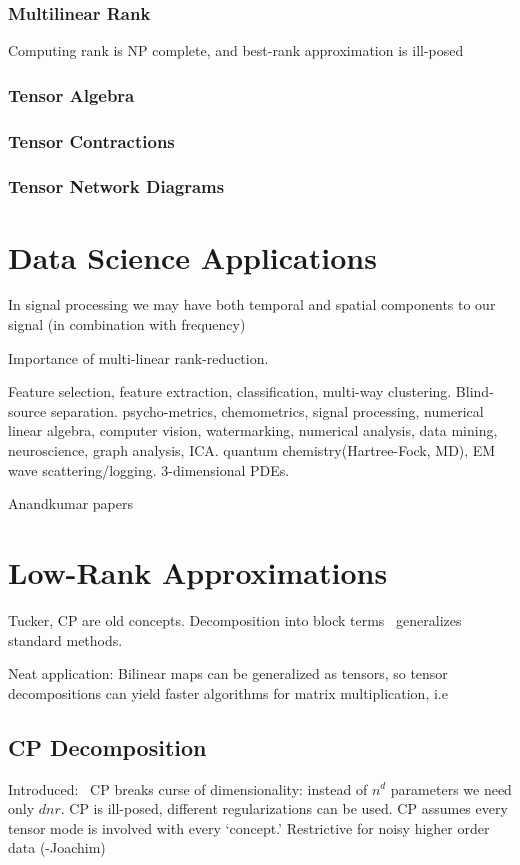 \documentclass[leqno,onefignum,onetabnum]{siamltex1213}
\begin{document}
\subsubsection{Multilinear Rank}
Computing rank is NP complete, and best-rank approximation is ill-posed~\cite{Kolda09tensordecompositions}
\subsubsection{Tensor Algebra}

\subsubsection{Tensor Contractions}

\subsubsection{Tensor Network Diagrams}

\section{Data Science Applications}
In signal processing we may have both temporal and spatial components to our signal (in combination with frequency)

Importance of multi-linear rank-reduction.

Feature selection, feature extraction, classification, multi-way clustering.
Blind-source separation. 
psycho-metrics, chemometrics, signal processing, numerical linear algebra, computer vision, watermarking, numerical analysis, data mining, neuroscience, graph analysis, ICA.
quantum chemistry(Hartree-Fock, MD), EM wave scattering/logging. 3-dimensional PDEs. 

Anandkumar papers~\cite{Anandk}
\section{Low-Rank Approximations}

Tucker, CP are old concepts. Decomposition into block terms~\cite{Lathauwer08decompositionsof} generalizes standard methods.

Neat application: Bilinear maps can be generalized as tensors, so tensor decompositions can yield faster algorithms for matrix multiplication, i.e~\cite{Benson}

\subsection{CP Decomposition}
Introduced:~\cite{hitchcock-sum-1927}
CP breaks curse of dimensionality: instead of $n^d$ parameters we need only $dnr$.
CP is ill-posed, different regularizations can be used.
CP assumes every tensor mode is involved with every `concept.' Restrictive for noisy higher order data (-Joachim)
\end{document}
